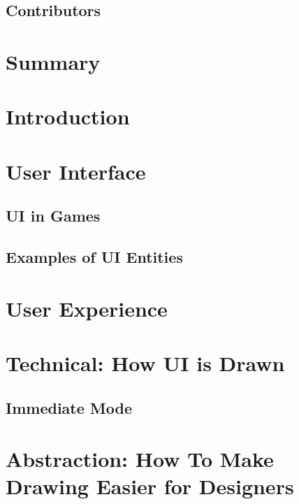 \documentclass[10pt,letterpaper]{article}
\begin{document}
\subsection*{Contributors}
\newpage

\section*{Summary}
\newpage

\listoffigures
{}
\listoftables
{}
\newpage

\setcounter{page}{1}
\setcounter{section}{-1}

\section{Introduction}

\section{User Interface}
\subsection{UI in Games}

\subsection{Examples of UI Entities}

\section{User Experience}

\section{Technical: How UI is Drawn}

\subsection{Immediate Mode}

\section{Abstraction: How To Make Drawing Easier for Designers}
\end{document}
